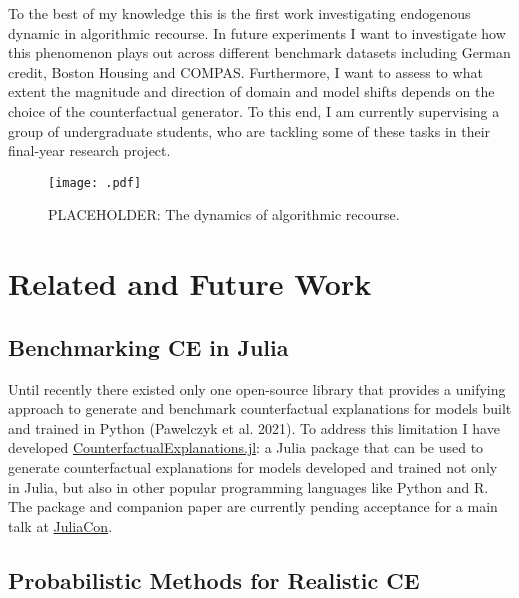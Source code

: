 \documentclass[
  sigconf]{acmart}
\begin{document}
To the best of my knowledge this is the first work investigating
endogenous dynamic in algorithmic recourse. In future experiments I want
to investigate how this phenomenon plays out across different benchmark
datasets including German credit, Boston Housing and COMPAS.
Furthermore, I want to assess to what extent the magnitude and direction
of domain and model shifts depends on the choice of the counterfactual
generator. To this end, I am currently supervising a group of
undergraduate students, who are tackling some of these tasks in their
final-year research project.

\begin{figure}

{\centering \texttt{[image: .pdf]}

}

\caption{\label{fig-dynamics}PLACEHOLDER: The dynamics of algorithmic
recourse.}

\end{figure}

\hypertarget{sec-related}{%
\section{Related and Future Work}\label{sec-related}}

\hypertarget{benchmarking-ce-in-julia}{%
\subsection{Benchmarking CE in Julia}\label{benchmarking-ce-in-julia}}

Until recently there existed only one open-source library that provides
a unifying approach to generate and benchmark counterfactual
explanations for models built and trained in Python (Pawelczyk et al.
2021). To address this limitation I have developed
\href{https://www.paltmeyer.com/CounterfactualExplanations.jl/stable/}{CounterfactualExplanations.jl}:
a Julia package that can be used to generate counterfactual explanations
for models developed and trained not only in Julia, but also in other
popular programming languages like Python and R. The package and
companion paper are currently pending acceptance for a main talk at
\href{https://juliacon.org/2022/}{JuliaCon}.

\hypertarget{probabilistic-methods-for-realistic-ce}{%
\subsection{Probabilistic Methods for Realistic
CE}\label{probabilistic-methods-for-realistic-ce}}
\end{document}
